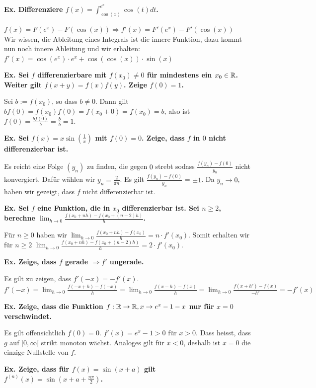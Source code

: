 \textbf{Ex. Differenziere $f(x) = \int_{\cos(x)}^{e^x}\cos(t)dt$.}

$f(x) = F(e^x) - F(\cos(x)) \Rightarrow f'(x) = F'(e^x) - F'(\cos(x))$ \\
Wir wissen, die Ableitung eines Integrals ist die innere Funktion, dazu kommt nun noch innere Ableitung
und wir erhalten:
$f'(x) = \cos(e^x) \cdot e^x + \cos(\cos(x)) \cdot \sin(x)$ \medskip

\textbf{Ex. Sei $f$ differenzierbare mit $f(x_0) \neq 0$ für mindestens ein $x_0 \in \mathbb{R}$. Weiter gilt
$f(x + y) = f(x)f(y)$. Zeige $f(0) = 1$.}

Sei $b := f(x_0)$, so dass $b \neq 0$. Dann gilt $bf(0) = f(x_0)f(0) = f(x_0 + 0) = f(x_0) = b$,
also ist $f(0) = \frac{bf(0)}{b} = \frac{b}{b} = 1$. \medskip

\textbf{Ex. Sei $f(x) = x\sin(\frac{1}{x})$ mit $f(0) = 0$. Zeige, dass $f$ in $0$ nicht differenzierbar ist.} 

Es reicht eine Folge $(y_n)$ zu finden, die gegen $0$ strebt sodass $\frac{f(y_n)-f(0)}{y_n}$ nicht
konvergiert. Dafür wählen wir $y_n = \frac{2}{\pi n}$. Es gilt $\frac{f(y_n)-f(0)}{y_n}$ = $\pm 1$.
Da $y_n \to 0$, haben wir gezeigt, dass $f$ nicht differenzierbar ist. \medskip

\textbf{Ex. Sei $f$ eine Funktion, die in $x_0$ differenzierbar ist. Sei $n \geq 2$, berechne $\lim_{h \to 0} \frac{f(x_0 + nh) - f(x_0 + (n-2)h)}{h}$.} 

Für $n \geq 0$ haben wir $\lim_{h \to 0} \frac{f(x_0 + nh) - f(x_0)}{h} = n \cdot f'(x_0)$. Somit erhalten
wir für $n \geq 2$ $\lim_{h \to 0} \frac{f(x_0 + nh) - f(x_0 + (n-2)h)}{h} = 2 \cdot f'(x_0)$. \medskip

\textbf{Ex. Zeige, dass $f$ gerade $\Rightarrow f'$ ungerade.}

Es gilt zu zeigen, dass $f'(-x) = -f'(x)$. $f'(-x) = \lim_{h \to 0} \frac{f(-x + h) - f(-x)}{h} =
\lim_{h \to 0} \frac{f(x - h) - f(x)}{h} = \lim_{h \to 0} \frac{f(x + h') - f(x)}{-h'} = -f'(x)$\medskip

\textbf{Ex. Zeige, dass die Funktion $f : \mathbb{R} \to \mathbb{R}, x \to e^x-1-x$ nur für $x = 0$ verschwindet.} 

Es gilt offensichtlich $f(0) = 0$. $f'(x) = e^x - 1 > 0$ für $x > 0$. Dass heisst, dass $g$ auf $]0, \infty[$
strikt monoton wächst. Analoges gilt für $x < 0$, deshalb ist $x = 0$ die einzige Nullstelle von $f$.
\medskip

\textbf{Ex. Zeige, dass für $f(x) = \sin(x + a)$ gilt $f^{(n)}(x) = \sin(x + a + \frac{n\pi}{2})$.} 

